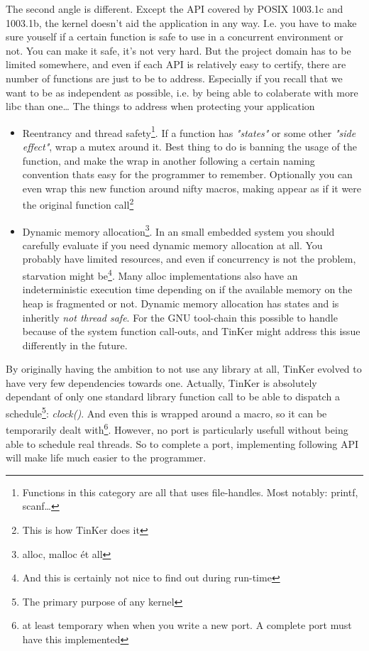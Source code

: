 The second angle is different. Except the API covered by POSIX 1003.1c and 1003.1b, the kernel doesn't aid the application in any way. I.e. you have to make sure youself if a certain function is safe to use in a concurrent environment or not. You can make it safe, it's not very hard. But the project domain has to be limited somewhere, and even if each API is relatively easy to certify, there are number of functions are just to be to address. Especially if you recall that we want to be as independent as possible, i.e. by being able to colaberate with more libc than one\ldots
The things to address when protecting your application
\begin{itemize}
	\item Reentrancy and thread safety\footnote{Functions in this category are all that uses file-handles. Most notably: printf, scanf\ldots}. If a function has \textit{"states"} or some other \textit{"side effect"}, wrap a mutex around it. Best thing to do is banning the usage of the function, and make the wrap in another following a certain naming convention thats easy for the programmer to remember. Optionally you can even wrap this new function around nifty macros, making appear as if it were the original function call\footnote{This is how TinKer does it}
	\item Dynamic memory allocation\footnote{alloc, malloc \'et all}. In an small embedded system you should carefully evaluate if you need dynamic memory allocation at all. You probably have limited resources, and even if concurrency is not the problem, starvation might be\footnote{And this is certainly not nice to find out during run-time}. Many alloc implementations also have an indeterministic execution time depending on if the available memory on the heap is fragmented or not. Dynamic memory allocation has states and is inheritly \textit{not thread safe}. For the GNU tool-chain this possible to handle because of the system function call-outs, and TinKer might address this issue differently in the future.
\end{itemize}
By originally having the ambition to not use any library at all, TinKer evolved to have very few dependencies towards one. Actually, TinKer is absolutely dependant of only one standard library function call to be able to dispatch a schedule\footnote{The primary purpose of any kernel}: \textit{clock()}. And even this is wrapped around a macro, so it can be temporarily dealt with\footnote{at least temporary when when you write a new port. A complete port must have this implemented}. However, no port is particularly usefull without being able to schedule real threads. So to complete a port, implementing following API will make life much easier to the programmer.
